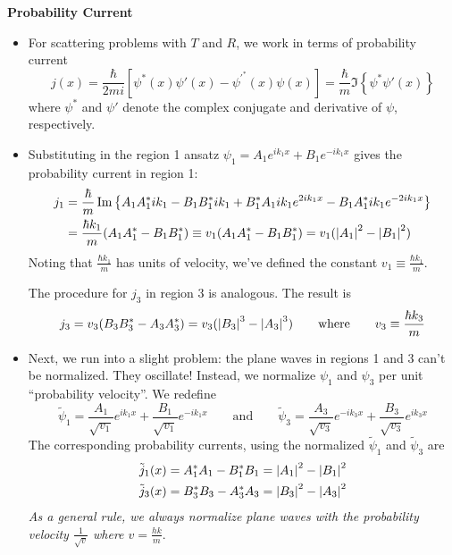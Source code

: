 \documentclass[11pt, a4paper]{article}
\newcommand{\eqtext}[1]{\qquad \text{#1} \qquad}
\begin{document}
\textbf{Probability Current} 
\begin{itemize}

	\item For scattering problems with $ T $ and $ R $, we work in terms of probability current
	\begin{equation*}
		j(x) = \frac{\hbar}{2mi}\left[\psi^{*}(x)\psi'(x) - \psi^{'^{*}}(x)\psi(x)\right] = \frac{\hbar}{m} \Im \left\{\psi^{*}\psi'(x)\right\}
	\end{equation*}
	where $ \psi^{*} $ and $ \psi' $ denote the complex conjugate and derivative of $ \psi $, respectively.
	
	\item Substituting in the region 1 ansatz $ \psi_{1} = A_{1} e^{ik_{1}x} + B_{1}e^{-ik_{1}x}  $  gives the probability current in region 1:
	\begin{align*}
		j_{1} &= \frac{\hbar}{m}\Im \left\{A_{1}A_{1}^{*}ik_{1} - B_{1}B_{1}^{*}ik_{1} + B_{1}^{*}A_{1}ik_{1}e^{2ik_{1}x} - B_{1}A_{1}^{*}ik_{1}e^{-2ik_{1}x}\right\}\\
		&=\frac{\hbar k_{1}}{m}(A_{1}A_{1}^{*} - B_{1}B_{1}^{*}) \equiv v_{1}(A_{1}A_{1}^{*} - B_{1}B_{1}^{*}) =  v_{1}(\abs{A_{1}}^{2} - \abs{B_{1}}^{2})
	\end{align*}
	Noting that $ \frac{\hbar k_{1}}{m} $ has units of velocity, we've defined the constant $ v_{1} \equiv \frac{\hbar k_{1}}{m} $. 
	
	The procedure for $ j_{3} $ in region 3 is analogous. The result is
	\begin{equation*}
		j_{3} = v_{3}(B_{3}B_{3}^{*} - A_{3}A_{3}^{*}) = v_{3}(\abs{B_{3}}^{3} - \abs{A_{3}}^{3}) \eqtext{where} v_{3} \equiv \frac{\hbar k_{3}}{m}
	\end{equation*}

	
	\item Next, we run into a slight problem: the plane waves in regions 1 and 3 can't be normalized. They oscillate! Instead, we normalize $ \psi_{1} $ and $ \psi_{3} $ per unit ``probability velocity''. We redefine 
	\begin{equation*}
		\tilde{\psi}_{1} = \frac{A_{1}}{\sqrt{v_{1}}} e^{ik_{1}x} + \frac{B_{1}}{\sqrt{v_{1}}}e^{-ik_{1}x} \eqtext{and} \tilde{\psi}_{3} = \frac{A_{3}}{\sqrt{v_{3}}} e^{-ik_{3}x} + \frac{B_{3}}{\sqrt{v_{3}}}e^{ik_{3}x}
	\end{equation*}
	The corresponding probability currents, using the normalized $ \tilde{\psi}_{1} $ and $ \tilde{\psi}_{3} $ are
	\begin{align*}
		&\tilde{j}_{1}(x) = A_{1}^{*}A_{1} - B_{1}^{*}B_{1} = \abs{A_{1}}^{2} - \abs{B_{1}}^{2}\\
		&\tilde{j}_{3}(x) = B_{3}^{*}B_{3} - A_{3}^{*}A_{3} = \abs{B_{3}}^{2} - \abs{A_{3}}^{2}
	\end{align*}
	\textit{As a general rule, we always normalize plane waves with the probability velocity $ \frac{1}{\sqrt{v}} $ where $ v = \frac{hk}{m} $}.
	

\end{itemize}
\end{document}
